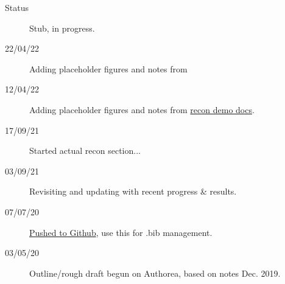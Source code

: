 \begin{description}
\item [{Status}] Stub, in progress.
\item [{22/04/22}] Adding placeholder figures and notes from
\item [{12/04/22}] Adding placeholder figures and notes from \href{https://pemtk.readthedocs.io/en/latest/fitting/PEMtk_analysis_demo_150621-tidy.html}{recon demo docs}.
\item [{17/09/21}] Started actual recon section...
\item [{03/09/21}] Revisiting and updating with recent progress \& results.
\item [{07/07/20}] \href{https://github.com/phockett/Extracting-Molecular-Frame-Photoionization-Dynamics-from-Experimental-Data}{Pushed to Github}, use this for .bib management.
\item [{03/05/20}] Outline/rough draft begun on Authorea, based on notes Dec. 2019.
\end{description}